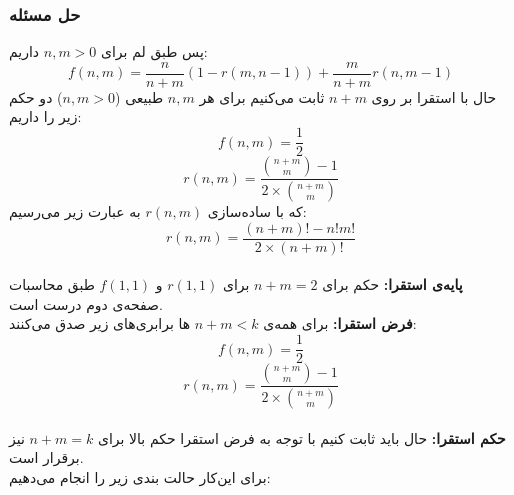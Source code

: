 \documentclass[12pt,a4paper]{article}
\begin{document}
\subsubsection*{حل مسئله}
پس طبق لم برای $n, m > 0$ داریم:
$$f(n, m) = \frac{n}{n+m}(1-r(m, n-1)) + \frac{m}{n+m}r(n, m-1)$$
حال با استقرا بر روی ‌$n+m$ ثابت می‌کنیم برای هر $n, m$ طبیعی 
($n, m > 0$)
دو حکم زیر را داریم:
$$
f(n, m) = \frac{1}{2}
$$
$$
r(n, m) = \frac{\binom{n+m}{m}-1}{2\times \binom{n+m}{m}}
$$
که با ساده‌سازی $r(n, m)$ به عبارت زیر می‌رسیم:
$$
r(n, m) = \frac{(n+m)! - n!m!}{2\times(n+m)!}
$$
\\
\textbf{پایه‌ی استقرا:}
حکم برای $n+m = 2$ برای $r(1, 1)$ و $f(1, 1)$ طبق محاسبات صفحه‌ی دوم درست است.
\\
\textbf{فرض استقرا:}
برای همه‌ی $n+m < k$ ها برابری‌های زیر صدق می‌کنند:
$$
f(n, m) = \frac{1}{2}
$$
$$
r(n, m) = \frac{\binom{n+m}{m}-1}{2\times \binom{n+m}{m}}
$$
\\
\textbf{حکم استقرا:}
حال باید ثابت کنیم با توجه به فرض استقرا حکم بالا برای 
$n+m = k$
نیز برقرار است.
\\
برای این‌کار حالت بندی زیر را انجام می‌دهیم:
\end{document}
